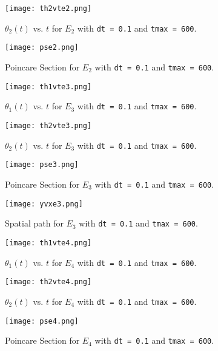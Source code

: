 \documentclass[12pt]{article}
\begin{document}
\begin{figure}[H]
\texttt{[image: th2vte2.png]}
\caption{$\theta_2(t)$ vs. $t$ for $E_2$ with {\tt dt = 0.1} and {\tt tmax = 600}.}
\label{th2vte2}
\end{figure}

\begin{figure}[H]
\texttt{[image: pse2.png]}
\caption{Poincare Section for $E_2$ with {\tt dt = 0.1} and {\tt tmax = 600}.}
\label{pse2}
\end{figure}

\begin{figure}[H]
\texttt{[image: th1vte3.png]}
\caption{$\theta_1(t)$ vs. $t$ for $E_3$ with {\tt dt = 0.1} and {\tt tmax = 600}.}
\label{th1vte3}
\end{figure}

\begin{figure}[H]
\texttt{[image: th2vte3.png]}
\caption{$\theta_2(t)$ vs. $t$ for $E_3$ with {\tt dt = 0.1} and {\tt tmax = 600}.}
\label{th2vte3}
\end{figure}

\begin{figure}[H]
\texttt{[image: pse3.png]}
\caption{Poincare Section for $E_3$ with {\tt dt = 0.1} and {\tt tmax = 600}.}
\label{pse3}
\end{figure}

\begin{figure}[H]
\texttt{[image: yvxe3.png]}
\caption{Spatial path for $E_3$ with {\tt dt = 0.1} and {\tt tmax = 600}.}
\label{yvxe3}
\end{figure}

\begin{figure}[H]
\texttt{[image: th1vte4.png]}
\caption{$\theta_1(t)$ vs. $t$ for $E_4$ with {\tt dt = 0.1} and {\tt tmax = 600}.}
\label{th1vte4}
\end{figure}

\begin{figure}[H]
\texttt{[image: th2vte4.png]}
\caption{$\theta_2(t)$ vs. $t$ for $E_4$ with {\tt dt = 0.1} and {\tt tmax = 600}.}
\label{th2vte4}
\end{figure}

\begin{figure}[H]
\texttt{[image: pse4.png]}
\caption{Poincare Section for $E_4$ with {\tt dt = 0.1} and {\tt tmax = 600}.}
\label{pse4}
\end{figure}
\end{document}
